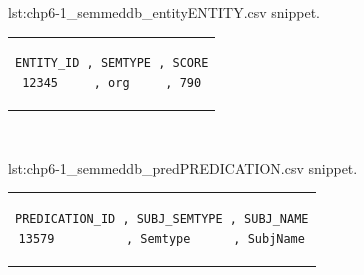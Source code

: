 


\noindent\begin{minipage}{0.42\linewidth}
\begin{captionedlisting}{lst:chp6-1_semmeddb_entity}{ENTITY.csv snippet.}
\centering
\begin{tabular}{c}
\hspace{-0.7em}
{
\begin{lstlisting}[basicstyle=\ttfamily\small,label={lst:chp6-1_semmeddb_entity},columns=flexible]
ENTITY_ID , SEMTYPE , SCORE
12345     , org     , 790
\end{lstlisting}
}
\end{tabular}
\end{captionedlisting}
\end{minipage}
\,\,\,\,\hfill
\begin{minipage}{0.58\linewidth}
\begin{captionedlisting}{lst:chp6-1_semmeddb_pred}{PREDICATION.csv snippet.}
\centering
\begin{tabular}{c}
\hspace{-1em}
{
\begin{lstlisting}[basicstyle=\ttfamily\small,label={lst:chp6-1_semmeddb_pred},columns=flexible]
PREDICATION_ID , SUBJ_SEMTYPE , SUBJ_NAME
13579          , Semtype      , SubjName
\end{lstlisting}
}
\end{tabular}
\end{captionedlisting}
\end{minipage}


